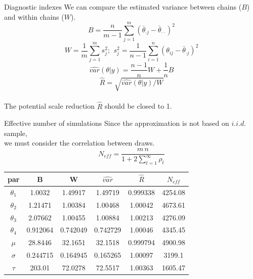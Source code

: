 \begin{frame}{Diagnostic indexes}
	We can compare the estimated variance between chains ($B$) and within chains ($W$).
	$$ B = \dfrac{n}{m-1} \sum_{j=1}^{m} (\bar{\theta}_{\cdot j} - \bar{\theta}_{\cdot \cdot})^2$$ 
	$$W = \dfrac{1}{m} \sum_{j=1}^{m} s_j^2; \,\ s_j^2 = \dfrac{1}{n-1} \sum_{i=1}^{n} (\theta_{ij} - \bar{\theta}_{\cdot j})^2$$
	$$\hat{var}(\theta|y)=\dfrac{n-1}{n} W + \dfrac{1}{n} B$$ 
	$$\hat{R} = \sqrt{\hat{var}(\theta|y)/W}$$\\
	\vspace{.1in}
	The potential scale reduction $\hat{R}$ should be closed to 1.
\end{frame}

\begin{frame}{Effective number of simulations}
Since the approximation is not based on $i.i.d.$ sample,\\
we must consider the correlation between draws.
$$N_{eff} = \dfrac{m \, n}{1+2 \sum_{t=1}^{\infty} \rho_t}$$

	\begin{center}
		\small
		\begin{tabular}{|c| c c c c c|}
			\hline	
	par & B & W & $\hat{var}$ & $\hat{R}$ & $N_{eff}$\\
	\hline	
	$\theta_1$ & 1.0032   & 1.49917 & 1.49719 & 0.999338& 4254.08\\
	$\theta_2$ & 1.21471  & 1.00384 & 1.00468 & 1.00042 & 4673.61\\
	$\theta_3$ & 2.07662  & 1.00455 & 1.00884 & 1.00213 & 4276.09\\
	$\theta_4$ & 0.912064 & 0.742049& 0.742729& 1.00046 & 4345.45\\
	$\mu$ 	   & 28.8446  & 32.1651 & 32.1518 & 0.999794& 4900.98\\
	$\sigma$   & 0.244715 & 0.164945& 0.165265& 1.00097 & 3199.1\\
	$\tau$ 	   & 203.01   & 72.0278 & 72.5517 & 1.00363 & 1605.47\\
	\hline	
		\end{tabular}
	\end{center}
\end{frame}